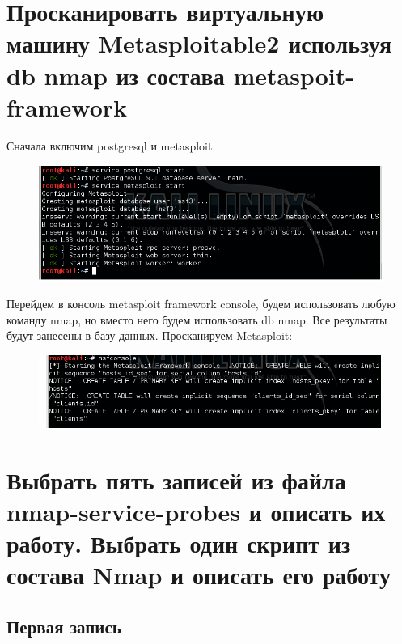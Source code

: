 \documentclass[utf8x, 12pt]{G7-32}
\begin{document}
 \newpage
\section{Просканировать виртуальную машину Metasploitable2 используя db nmap из состава metaspoit-framework}

Сначала включим postgresql и metasploit:

\begin{figure}[hhh!]
	\begin{center}
		\includegraphics[width=16cm]{img2/291}
	\end{center}
\end{figure}

Перейдем в консоль metasploit framework console, будем использовать любую команду nmap, но вместо него будем использовать db nmap. Все результаты будут занесены в базу данных. Просканируем Metasploit:

\begin{figure}[hhh!]
	\begin{center}
		\includegraphics[width=16cm]{img2/292}
	\end{center}
\end{figure}


 \newpage
\section{Выбрать пять записей из файла nmap-service-probes и описать их работу. Выбрать один скрипт из состава Nmap и описать его работу}

\subsection{Первая запись}
\end{document}
